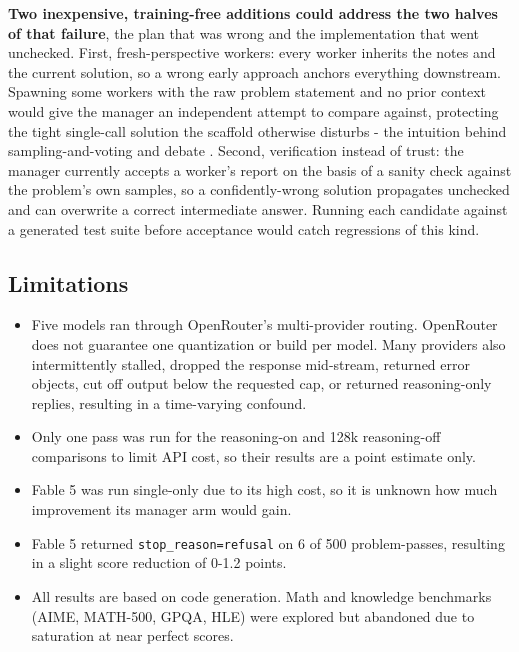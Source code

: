 \documentclass[journal]{IEEEtran}
\begin{document}
\textbf{Two inexpensive, training-free additions could address the two halves of that failure},
the plan that was wrong and the implementation that went unchecked. First,
fresh-perspective workers: every worker inherits the notes and the current solution, so a
wrong early approach anchors everything downstream. Spawning some workers with the raw problem
statement and no prior context would give the manager an independent attempt to compare against,
protecting the tight single-call solution the scaffold otherwise disturbs - the intuition
behind sampling-and-voting and debate \cite{li2024,du2023}. Second, verification instead
of trust: the manager currently accepts a worker's report on the basis of a sanity check against
the problem's own samples, so a confidently-wrong solution propagates unchecked and can overwrite
a correct intermediate answer. Running each candidate against a generated test suite before
acceptance would catch regressions of this kind.

\subsection{Limitations}
\label{sec:limitations}

\begin{itemize}
  \item Five models ran through OpenRouter's multi-provider routing. OpenRouter does
  not guarantee one quantization or build per model. Many providers also intermittently stalled, dropped the response
  mid-stream, returned error objects, cut off output below the requested cap, or returned
  reasoning-only replies, resulting in a time-varying confound.

  \item Only one pass was run for the reasoning-on and 128k
  reasoning-off comparisons to limit API cost, so their results are a point estimate only.

  \item Fable 5 was run single-only due to its high cost, so it is unknown how much improvement its manager arm would gain.

  \item Fable 5
  returned \texttt{stop\_reason=refusal} on 6 of 500 problem-passes, resulting in a slight score reduction of 0-1.2 points.

  \item All results are based on code
  generation. Math and knowledge benchmarks (AIME, MATH-500, GPQA, HLE) were explored but abandoned due to saturation at near perfect scores.
\end{itemize}
\end{document}
